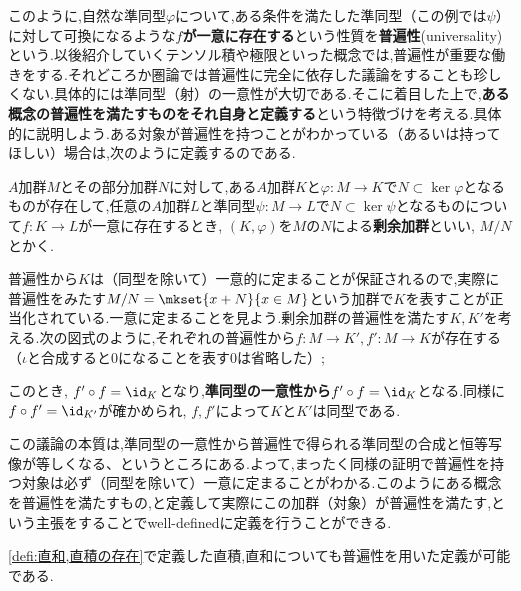 このように,自然な準同型$\varphi$について,ある条件を満たした準同型（この例では$\psi$）に対して可換になるような\textbf{$f$が一意に存在する}という性質を\textbf{普遍性}(universality)という.以後紹介していくテンソル積や極限といった概念では,普遍性が重要な働きをする.それどころか圏論では普遍性に完全に依存した議論をすることも珍しくない.具体的には準同型（射）の一意性が大切である.そこに着目した上で,\textbf{ある概念の普遍性を満たすものをそれ自身と定義する}という特徴づけを考える.具体的に説明しよう.ある対象が普遍性を持つことがわかっている（あるいは持ってほしい）場合は,次のように定義するのである.

\begin{defi}[普遍性による剰余加群の定義]
	$A$加群$M$とその部分加群$N$に対して,ある$A$加群$K$と$\varphi:M\to K$で$N\subset\ker\varphi$となるものが存在して,任意の$A$加群$L$と準同型$\psi:M\to L$で$N\subset\ker\psi$となるものについて$f:K\to L$が一意に存在するとき, $(K,\varphi)$を$M$の$N$による\textbf{剰余加群}といい, $M/N$とかく.
\end{defi}

普遍性から$K$は（同型を除いて）一意的に定まることが保証されるので,実際に普遍性をみたす$M/N=\mkset{x+N}{x\in M}$という加群で$K$を表すことが正当化されている.一意に定まることを見よう.剰余加群の普遍性を満たす$K,K'$を考える.次の図式のように,それぞれの普遍性から$f:M\to K',f':M\to K$が存在する（$\iota$と合成すると$0$になることを表す$0$は省略した）;
\begin{figure}[H]
	\centering
	\caption{}
\end{figure}

このとき, $f'\circ f=\id_K$となり,\textbf{準同型の一意性から}$f'\circ f=\id_K$となる.同様に$f\circ f'=\id_{K'}$が確かめられ, $f,f'$によって$K$と$K'$は同型である.

この議論の本質は,準同型の一意性から普遍性で得られる準同型の合成と恒等写像が等しくなる、というところにある.よって,まったく同様の証明で普遍性を持つ対象は必ず（同型を除いて）一意に定まることがわかる.このようにある概念を普遍性を満たすもの,と定義して実際にこの加群（対象）が普遍性を満たす,という主張をすることでwell-definedに定義を行うことができる.

\ref{defi:直和,直積の存在}で定義した直積,直和についても普遍性を用いた定義が可能である.

